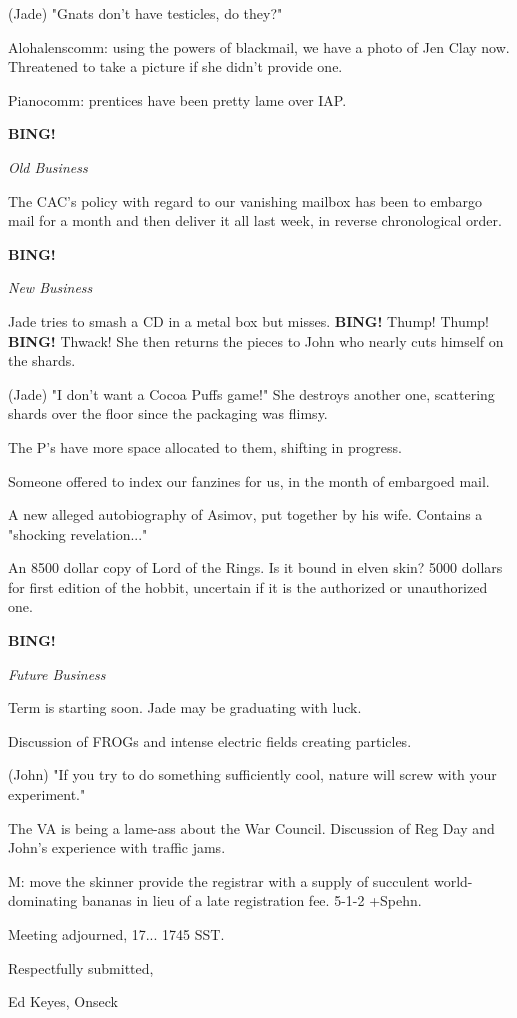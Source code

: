 \documentclass[12pt]{article}
\newcommand{\bing}{{\bf BING!} }
\newcommand{\goto}[1]{\bing \vskip 12pt \centerline{{\em{#1}}}}
\begin{document}
(Jade) "Gnats don't have testicles, do they?"

Alohalenscomm: using the powers of blackmail, we have a photo of Jen Clay now. Threatened to take a picture if she didn't provide one.

Pianocomm: prentices have been pretty lame over IAP.

\goto{Old Business}

The CAC's policy with regard to our vanishing mailbox has been to embargo mail for a month and then deliver it all last week, in reverse chronological order.

\goto{New Business}

Jade tries to smash a CD in a metal box but misses. \bing Thump! Thump! \bing Thwack! She then returns the pieces to John who nearly cuts himself on the shards.

(Jade) "I don't want a Cocoa Puffs game!" She destroys another one, scattering shards over the floor since the packaging was flimsy.

The P's have more space allocated to them, shifting in progress.

Someone offered to index our fanzines for us, in the month of embargoed mail.

A new alleged autobiography of Asimov, put together by his wife. Contains a "shocking revelation..."

An 8500 dollar copy of Lord of the Rings. Is it bound in elven skin? 5000 dollars for first edition of the hobbit, uncertain if it is the authorized or unauthorized one.

\goto{Future Business}

Term is starting soon. Jade may be graduating with luck.

Discussion of FROGs and intense electric fields creating particles.

(John) "If you try to do something sufficiently cool, nature will screw with your experiment."

The VA is being a lame-ass about the War Council. Discussion of Reg Day and John's experience with traffic jams.

M: move the skinner provide the registrar with a supply of succulent world-dominating bananas in lieu of a late registration fee. 5-1-2 +Spehn.

\vspace{12pt}

\noindent
Meeting adjourned, 17... 1745 SST.

\vspace{18pt}

\centerline{Respectfully submitted,}
\centerline{Ed Keyes, Onseck}
\end{document}
